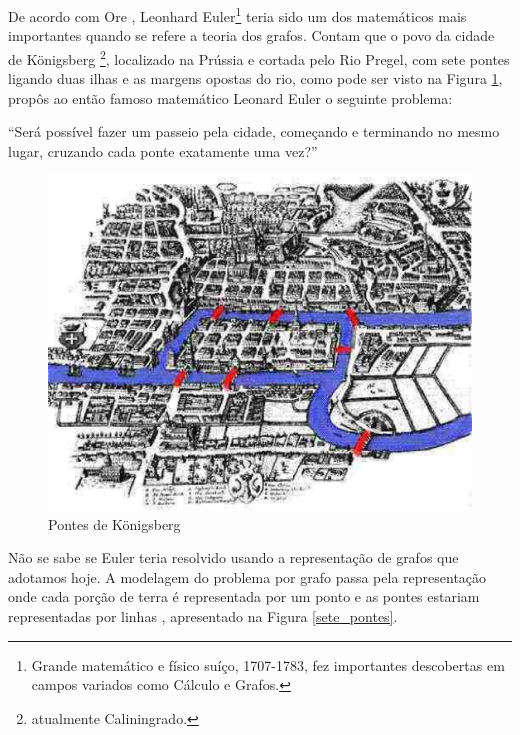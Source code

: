 De acordo com Ore \cite{Ore:1963}, Leonhard Euler\footnote{Grande matemático e físico suíço, 1707-1783, fez importantes descobertas em campos variados como Cálculo e Grafos.} teria sido um dos matemáticos mais importantes quando se refere a teoria dos grafos. Contam que o povo da cidade de Königsberg \footnote{atualmente Caliningrado.}, localizado na Prússia e cortada pelo Rio Pregel, com sete pontes ligando duas ilhas e as margens opostas do rio, como pode ser visto na Figura \ref{Konigsberg}, propôs ao então famoso matemático Leonard Euler o seguinte problema:

	“Será possível fazer um passeio pela cidade, começando e
	terminando no mesmo lugar, cruzando cada ponte exatamente uma vez?”

\begin{figure}[!h]
	\centering
	\includegraphics[scale=0.35]{figuras/capitulo2/Konigsberg.eps}
	\caption{Pontes de Königsberg}
	\label{Konigsberg}
\end{figure}

Não se sabe se Euler teria resolvido usando a representação de grafos que adotamos hoje. A modelagem do problema por grafo passa pela representação onde cada porção de terra  é representada por um ponto e as pontes estariam representadas por linhas \cite{Ore:1963}, apresentado na Figura \ref{sete_pontes}.

